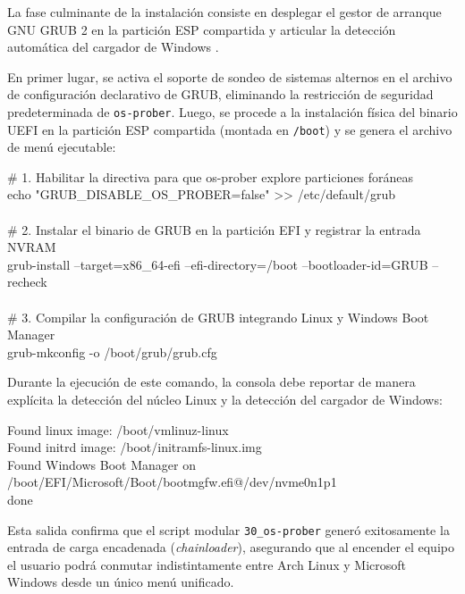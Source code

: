 \documentclass[12pt]{article}
\begin{document}
La fase culminante de la instalación consiste en desplegar el gestor de arranque GNU GRUB 2 en la partición ESP compartida y articular la detección automática del cargador de Windows \parencite{gnugrub2024manual}.

En primer lugar, se activa el soporte de sondeo de sistemas alternos en el archivo de configuración declarativo de GRUB, eliminando la restricción de seguridad predeterminada de \texttt{os-prober}. Luego, se procede a la instalación física del binario UEFI en la partición ESP compartida (montada en \texttt{/boot}) y se genera el archivo de menú ejecutable:

\begin{mdframed}[style=terminal]
\ttfamily\upshape\color{bashLetterColor}\footnotesize
\# 1. Habilitar la directiva para que os-prober explore particiones foráneas \\
echo "GRUB\_DISABLE\_OS\_PROBER=false" >> /etc/default/grub \\
\\
\# 2. Instalar el binario de GRUB en la partición EFI y registrar la entrada NVRAM \\
grub-install --target=x86\_64-efi --efi-directory=/boot --bootloader-id=GRUB --recheck \\
\\
\# 3. Compilar la configuración de GRUB integrando Linux y Windows Boot Manager \\
grub-mkconfig -o /boot/grub/grub.cfg
\end{mdframed}

Durante la ejecución de este comando, la consola debe reportar de manera explícita la detección del núcleo Linux y la detección del cargador de Windows:
\begin{mdframed}[style=terminal]
\ttfamily\upshape\color{bashLetterColor}\footnotesize
Found linux image: /boot/vmlinuz-linux \\
Found initrd image: /boot/initramfs-linux.img \\
Found Windows Boot Manager on /boot/EFI/Microsoft/Boot/bootmgfw.efi@/dev/nvme0n1p1 \\
done
\end{mdframed}

Esta salida confirma que el script modular \texttt{30\_os-prober} generó exitosamente la entrada de carga encadenada (\textit{chainloader}), asegurando que al encender el equipo el usuario podrá conmutar indistintamente entre Arch Linux y Microsoft Windows desde un único menú unificado.
\end{document}
